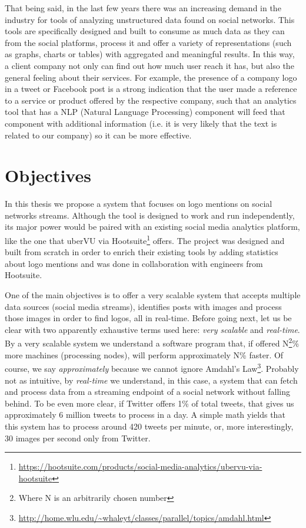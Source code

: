 That being said, in the last few years there was an increasing demand in the
industry for tools of analyzing unstructured data found on social networks.
This tools are specifically designed and built to consume as much data as they
can from the social platforms, process it and offer a variety of
representations (such as graphs, charts or tables) with aggregated and
meaningful results. In this way, a client company not only can find out how
much user reach it has, but also the general feeling about their services. For
example, the presence of a company logo in a tweet or Facebook post is a
strong indication that the user made a reference to a service or product
offered by the respective company, such that an analytics tool that has a
NLP (Natural Language Processing) component will feed that component with
additional information (i.e. it is very likely that the text is related to our
company) so it can be more effective.

\section{Objectives}

In this thesis we propose a system that focuses on logo mentions on social
networks streams. Although the tool is designed to work and run independently,
its major power would be paired with an existing social media analytics
platform, like the one that uberVU via
Hootsuite\footnote{\url{https://hootsuite.com/products/social-media-analytics/ubervu-via-hootsuite}}
offers. The project was designed and built from scratch in order to enrich
their existing tools by adding statistics about logo mentions and was done in
collaboration with engineers from Hootsuite.

One of the main objectives is to offer a very scalable system that accepts
multiple data sources (social media streams), identifies posts with images and
process those images in order to find logos, all in real-time. Before going
next, let us be clear with two apparently exhaustive terms used here:
\textit{very scalable} and \textit{real-time}. By a very scalable
system we understand a software program that, if offered
N\footnote{Where N is an arbitrarily chosen number}\% more
machines (processing nodes), will perform approximately N\% faster.
Of course, we say \textit{approximately} because we cannot ignore Amdahl's
Law\footnote{\url{http://home.wlu.edu/~whaleyt/classes/parallel/topics/amdahl.html}}.
Probably not as intuitive, by \textit{real-time} we understand, in this case, a
system that can fetch and process data from a streaming endpoint of a social
network without falling behind. To be even more clear, if Twitter offers
1\% of total tweets, that gives us approximately 6 million tweets to
process in a day. A simple math yields that this system has to process around
420 tweets per minute, or, more interestingly, 30 images per second only from
Twitter.

